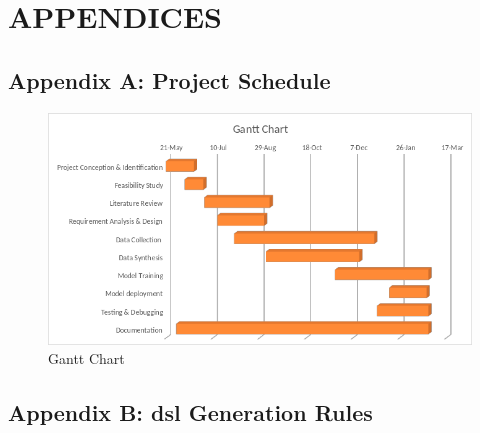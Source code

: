 \documentclass{ioereport}
\begin{document}
    \pagebreak
    
\section{\MakeUppercase{Appendices}} \label{sec:appendices}
   
    \subsection*{Appendix A: Project Schedule}
    \begin{figure}[H]
        \includegraphics[width=\textwidth]{images/gantt.png}\caption{Gantt Chart}\label{fig:tabgant}
    \end{figure}

    
    \subsection*{Appendix B: \gls{dsl} Generation Rules}
\end{document}
